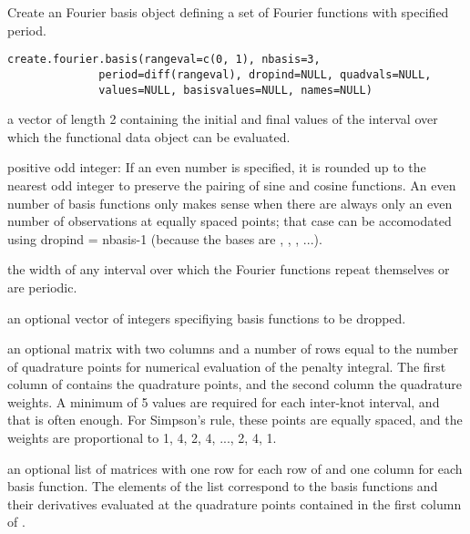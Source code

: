 \begin{Description}\relax
Create an Fourier basis object defining a set of Fourier
functions with specified period.
\end{Description}
\begin{Usage}
\begin{verbatim}
create.fourier.basis(rangeval=c(0, 1), nbasis=3,
              period=diff(rangeval), dropind=NULL, quadvals=NULL,
              values=NULL, basisvalues=NULL, names=NULL)
\end{verbatim}
\end{Usage}
\begin{Arguments}
\begin{ldescription}
\item[\code{rangeval}] a vector of length 2 containing the initial and final values of the
interval over which the functional data object can be evaluated.

\item[\code{nbasis}] positive odd integer:  If an even number is specified, it is rounded
up to the nearest odd integer to preserve the pairing of sine and
cosine functions.  An even number of basis functions  only makes
sense when there are always only an even number of observations at
equally spaced points;  that case can be accomodated using dropind =
nbasis-1 (because the bases are , ,
, ...).

\item[\code{period}] the width of any interval over which the Fourier functions repeat
themselves or are periodic.

\item[\code{dropind}] an optional vector of integers specifiying basis functions to be
dropped.

\item[\code{quadvals}] an optional matrix with two columns and a number of rows equal to
the number of quadrature points for numerical evaluation of the
penalty integral.  The first column of  contains the
quadrature points, and the second column the quadrature weights.  A
minimum of 5 values are required for each inter-knot interval, and
that is often enough.  For Simpson's rule, these points are equally
spaced, and the weights are proportional to 1, 4, 2, 4, ..., 2, 4,
1.

\item[\code{values}] an optional list of matrices with one row for each row of
 and one column for each basis function.  The
elements of the list correspond to the basis functions and their
derivatives evaluated at the quadrature points contained in the
first column of .


\end{ldescription}
\end{Arguments}
